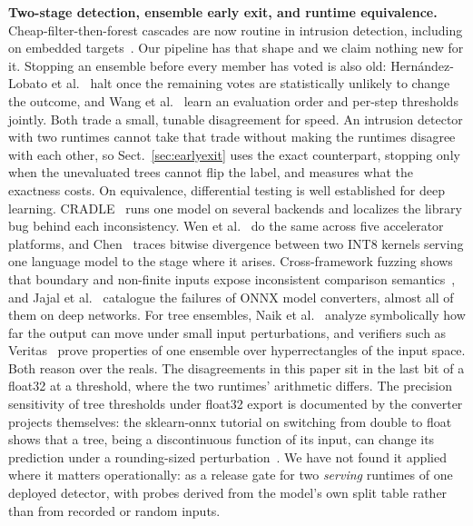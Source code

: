 \documentclass[runningheads]{llncs}
\begin{document}
\textbf{Two-stage detection, ensemble early exit, and runtime equivalence.} Cheap-filter-then-forest cascades are now routine in intrusion detection, including on embedded targets~\cite{ferreira2026canbus}. Our pipeline has that shape and we claim nothing new for it. Stopping an ensemble before every member has voted is also old: Hern\'andez-Lobato et al.~\cite{hernandezlobato2009pruning} halt once the remaining votes are statistically unlikely to change the outcome, and Wang et al.~\cite{wang2018qwyc} learn an evaluation order and per-step thresholds jointly. Both trade a small, tunable disagreement for speed. An intrusion detector with two runtimes cannot take that trade without making the runtimes disagree with each other, so Sect.~\ref{sec:earlyexit} uses the exact counterpart, stopping only when the unevaluated trees cannot flip the label, and measures what the exactness costs. On equivalence, differential testing is well established for deep learning. CRADLE~\cite{pham2019cradle} runs one model on several backends and localizes the library bug behind each inconsistency. Wen et al.~\cite{wen2025mindthegap} do the same across five accelerator platforms, and Chen~\cite{chen2026integeralibi} traces bitwise divergence between two INT8 kernels serving one language model to the stage where it arises. Cross-framework fuzzing shows that boundary and non-finite inputs expose inconsistent comparison semantics~\cite{duan2026xamt}, and Jajal et al.~\cite{jajal2024onnxconverters} catalogue the failures of ONNX model converters, almost all of them on deep networks. For tree ensembles, Naik et al.~\cite{naik2026sensitivity} analyze symbolically how far the output can move under small input perturbations, and verifiers such as Veritas~\cite{devos2021veritas} prove properties of one ensemble over hyperrectangles of the input space. Both reason over the reals. The disagreements in this paper sit in the last bit of a float32 at a threshold, where the two runtimes' arithmetic differs. The precision sensitivity of tree thresholds under float32 export is documented by the converter projects themselves: the sklearn-onnx tutorial on switching from double to float shows that a tree, being a discontinuous function of its input, can change its prediction under a rounding-sized perturbation~\cite{sklearnonnx_float}. We have not found it applied where it matters operationally: as a release gate for two \emph{serving} runtimes of one deployed detector, with probes derived from the model's own split table rather than from recorded or random inputs.
\end{document}
